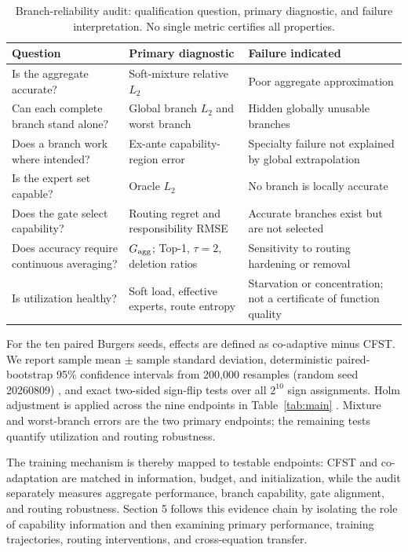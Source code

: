 \documentclass[preprint,12pt]{elsarticle}
\theoremstyle{remark}
\begin{document}
\begin{table}[H]
\centering\scriptsize
\caption{Branch-reliability audit: qualification question, primary diagnostic, and failure interpretation. No single metric certifies all properties.}
\label{tab:audit_map}
\begin{tabularx}{\linewidth}{@{}p{2.8cm}p{3.1cm}X@{}}
\toprule
Question & Primary diagnostic & Failure indicated\\
\midrule
Is the aggregate accurate? & Soft-mixture relative $L_2$ & Poor aggregate approximation\\
Can each complete branch stand alone? & Global branch $L_2$ and worst branch & Hidden globally unusable branches\\
Does a branch work where intended? & Ex-ante capability-region error & Specialty failure not explained by global extrapolation\\
Is the expert set capable? & Oracle $L_2$ & No branch is locally accurate\\
Does the gate select capability? & Routing regret and responsibility RMSE & Accurate branches exist but are not selected\\
Does accuracy require continuous averaging? & $G_{\rm agg}$; Top-1, $\tau=2$, deletion ratios & Sensitivity to routing hardening or removal\\
Is utilization healthy? & Soft load, effective experts, route entropy & Starvation or concentration; not a certificate of function quality\\
\bottomrule
\end{tabularx}
\end{table}

For the ten paired Burgers seeds, effects are defined as co-adaptive minus CFST. We report sample mean $\pm$ sample standard deviation, deterministic paired-bootstrap 95\% confidence intervals from 200,000 resamples (random seed 20260809) \cite{efron1979}, and exact two-sided sign-flip tests over all $2^{10}$ sign assignments. Holm adjustment is applied across the nine endpoints in Table~\ref{tab:main} \cite{holm1979}. Mixture and worst-branch errors are the two primary endpoints; the remaining tests quantify utilization and routing robustness.

The training mechanism is thereby mapped to testable endpoints: CFST and co-adaptation are matched in information, budget, and initialization, while the audit separately measures aggregate performance, branch capability, gate alignment, and routing robustness. Section 5 follows this evidence chain by isolating the role of capability information and then examining primary performance, training trajectories, routing interventions, and cross-equation transfer.
\end{document}
